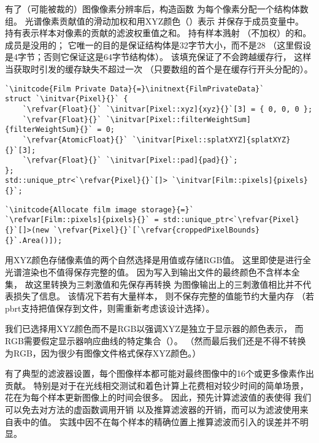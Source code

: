 有了（可能被裁的）图像像素分辨率后，构造函数
为每个像素分配一个结构体数组。
光谱像素贡献值的滑动加权和用XYZ颜色（）表示
并保存于成员变量中。
持有表示样本对像素的贡献的滤波权重值之和。
持有样本溅射
（不加权）的和。
成员是没用的；
它唯一的目的是保证结构体是32字节大小，而不是28
（这里假设是4字节；否则它保证这是64字节结构体）。
该填充保证了不会跨越缓存行，
这样当获取时引发的缓存缺失不超过一次
（只要数组的首个是在缓存行开头分配的）。
\begin{lstlisting}
`\initcode{Film Private Data}{=}\initnext{FilmPrivateData}`
struct `\initvar{Pixel}{}` {
    `\refvar{Float}{}` `\initvar[Pixel::xyz]{xyz}{}`[3] = { 0, 0, 0 };
    `\refvar{Float}{}` `\initvar[Pixel::filterWeightSum]{filterWeightSum}{}` = 0;
    `\refvar{AtomicFloat}{}` `\initvar[Pixel::splatXYZ]{splatXYZ}{}`[3];
    `\refvar{Float}{}` `\initvar[Pixel::pad]{pad}{}`;
};
std::unique_ptr<`\refvar{Pixel}{}`[]> `\initvar[Film::pixels]{pixels}{}`;
\end{lstlisting}
\begin{lstlisting}
`\initcode{Allocate film image storage}{=}`
`\refvar[Film::pixels]{pixels}{}` = std::unique_ptr<`\refvar{Pixel}{}`[]>(new `\refvar{Pixel}{}`[`\refvar{croppedPixelBounds}{}`.Area()]);
\end{lstlisting}

用XYZ颜色存储像素值的两个自然选择是用值或存储RGB值。
这里即使是进行全光谱渲染也不值得保存完整的值。
因为写入到输出文件的最终颜色不含样本全集，
故这里转换为三刺激值和先保存再转换
为图像输出上的三刺激值相比并不代表损失了信息。
该情况下若有大量样本，
则不保存完整的值能节约大量内存
（若pbrt支持把值保存到文件，则需重新考虑该设计选择）。

我们已选择用XYZ颜色而不是RGB以强调XYZ是独立于显示器的颜色表示，
而RGB需要假定显示器响应曲线的特定集合（）。
（然而最后我们还是不得不转换为RGB，因为很少有图像文件格式保存XYZ颜色。）

有了典型的滤波器设置，每个图像样本都可能对最终图像中的16个或更多像素作出贡献。
特别是对于在光线相交测试和着色计算上花费相对较少时间的简单场景，
花在为每个样本更新图像上的时间会很多。
因此，预先计算滤波值的表使得
我们可以免去对方法的虚函数调用开销
以及推算滤波器的开销，而可以为滤波使用来自表中的值。
实践中因不在每个样本的精确位置上推算滤波而引入的误差并不明显。

